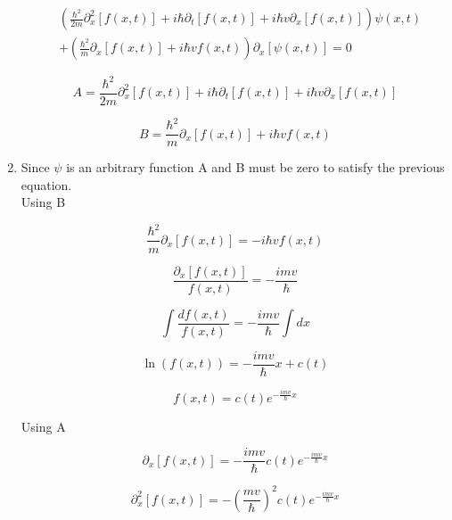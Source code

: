 \documentclass[12pt]{article}
\begin{document}
\begin{enumerate}
          \begin{equation*}
              \begin{split}
                   & \left(
                  \frac{\hbar^2}{2m} \partial^2_x [f(x,t)]
                  + i\hbar \partial_t [f(x,t)]
                  + i \hbar v \partial_x [f(x,t)]
                  \right)\psi(x,t) \\ &
                  + \left(
                  \frac{\hbar^2}{m} \partial_x [f(x,t)]
                  + i \hbar v f(x,t)
                  \right) \partial_x [\psi(x,t)]
                  = 0
              \end{split}
          \end{equation*}

          \[
              A = \frac{\hbar^2}{2m} \partial^2_x [f(x,t)]
              + i\hbar \partial_t [f(x,t)]
              + i \hbar v \partial_x [f(x,t)]
          \]

          \[
              B = \frac{\hbar^2}{m} \partial_x [f(x,t)]
              + i \hbar v f(x,t)
          \]

    \item

          Since $\psi$ is an arbitrary function A and B must be zero to satisfy the previous equation.\\
          Using B

          \[
              \frac{\hbar^2}{m} \partial_x [f(x,t)]
              = -i \hbar v f(x,t)
          \]

          \[
              \frac{\partial_x [f(x,t)]}{f(x,t)} = -\frac{i m v}{\hbar}
          \]

          \[
              \int\frac{d f(x,t)}{f(x,t)} = - \frac{i m v}{\hbar} \int dx
          \]

          \[
              \ln(f(x,t)) = -\frac{i m v}{\hbar}x + c(t)
          \]

          \[
              f(x,t) = c(t) e^{-\frac{i m v}{\hbar}x}
          \]



          Using A

          \[
              \partial_x [f(x,t)] = -\frac{i m v}{\hbar} c(t) e^{-\frac{i m v}{\hbar}x}
          \]

          \[
              \partial^2_x [f(x,t)] = -{(\frac{m v}{\hbar})}^2 c(t)e^{-\frac{i m v}{\hbar}x}
          \]


\end{enumerate}
\end{document}

